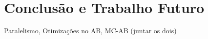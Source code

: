 \documentclass[12pt,a4paper,oneside]{article}
\begin{document}
\lipsum[3]


\section{Conclusão e Trabalho Futuro}
\label{sec:conc}

Paralelismo, Otimizações no AB, MC-AB (juntar os dois)

\lipsum[1]

\lipsum[2]



\end{document}
